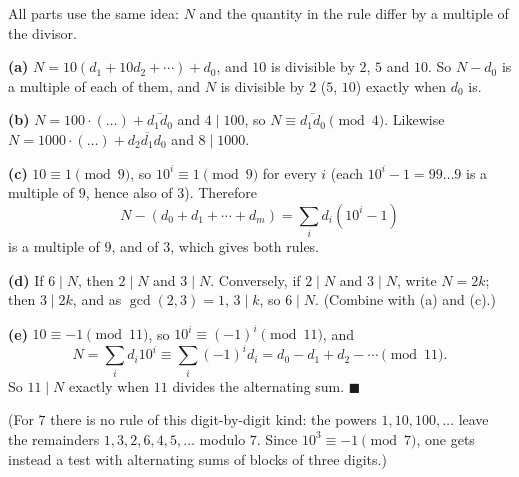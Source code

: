 All parts use the same idea: $N$ and the quantity in the rule differ by a multiple of the divisor.

\textbf{(a)} $N=10\left(d_1+10d_2+\cdots\right)+d_0$, and $10$ is divisible by $2$, $5$ and $10$. So $N-d_0$ is a multiple of each of them, and $N$ is divisible by $2$ ($5$, $10$) exactly when $d_0$ is.

\textbf{(b)} $N=100\cdot(\ldots)+\overline{d_1d_0}$ and $4\mid100$, so $N\equiv\overline{d_1d_0}\pmod4$. Likewise $N=1000\cdot(\ldots)+\overline{d_2d_1d_0}$ and $8\mid1000$.

\textbf{(c)} $10\equiv1\pmod9$, so $10^i\equiv1\pmod9$ for every $i$ (each $10^i-1=99\ldots9$ is a multiple of $9$, hence also of $3$). Therefore
\[N-(d_0+d_1+\cdots+d_m)=\sum_i d_i\left(10^i-1\right)\]
is a multiple of $9$, and of $3$, which gives both rules.

\textbf{(d)} If $6\mid N$, then $2\mid N$ and $3\mid N$. Conversely, if $2\mid N$ and $3\mid N$, write $N=2k$; then $3\mid2k$, and as $\gcd(2,3)=1$, $3\mid k$, so $6\mid N$. (Combine with (a) and (c).)

\textbf{(e)} $10\equiv-1\pmod{11}$, so $10^i\equiv(-1)^i\pmod{11}$, and
\[N=\sum_i d_i10^i\equiv\sum_i(-1)^id_i=d_0-d_1+d_2-\cdots\pmod{11}.\]
So $11\mid N$ exactly when $11$ divides the alternating sum. $\blacksquare$

(For $7$ there is no rule of this digit-by-digit kind: the powers $1,10,100,\ldots$ leave the remainders $1,3,2,6,4,5,\ldots$ modulo $7$. Since $10^3\equiv-1\pmod7$, one gets instead a test with alternating sums of blocks of three digits.)
